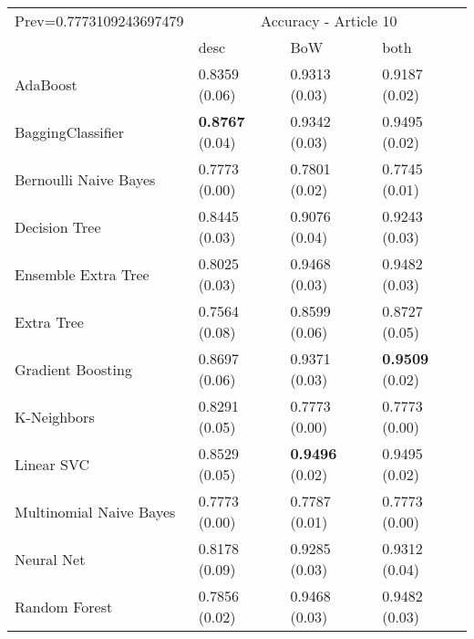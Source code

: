 \begin{tabular}{|l|l|l|l| }
\hline
Prev=0.7773109243697479 &  \multicolumn{3}{c|}{Accuracy - Article 10} \\
\cline{2-4} & desc & BoW & both \\ \hline
AdaBoost                & 0.8359 (0.06) & 0.9313 (0.03) & 0.9187 (0.02)\\
BaggingClassifier       & {\bf 0.8767} (0.04) & 0.9342 (0.03) & 0.9495 (0.02)\\
Bernoulli Naive Bayes   & 0.7773 (0.00) & 0.7801 (0.02) & 0.7745 (0.01)\\
Decision Tree           & 0.8445 (0.03) & 0.9076 (0.04) & 0.9243 (0.03)\\
Ensemble Extra Tree     & 0.8025 (0.03) & 0.9468 (0.03) & 0.9482 (0.03)\\
Extra Tree              & 0.7564 (0.08) & 0.8599 (0.06) & 0.8727 (0.05)\\
Gradient Boosting       & 0.8697 (0.06) & 0.9371 (0.03) & {\bf 0.9509} (0.02)\\
K-Neighbors             & 0.8291 (0.05) & 0.7773 (0.00) & 0.7773 (0.00)\\
Linear SVC              & 0.8529 (0.05) & {\bf 0.9496} (0.02) & 0.9495 (0.02)\\
Multinomial Naive Bayes & 0.7773 (0.00) & 0.7787 (0.01) & 0.7773 (0.00)\\
Neural Net              & 0.8178 (0.09) & 0.9285 (0.03) & 0.9312 (0.04)\\
Random Forest           & 0.7856 (0.02) & 0.9468 (0.03) & 0.9482 (0.03)\\
\hline
\end{tabular}